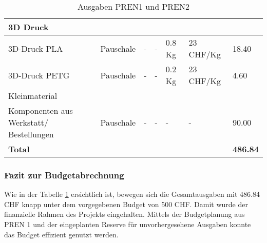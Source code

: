\documentclass[main.tex]{subfiles} %
\begin{document}
\begin{table}[htbp]
{\begin{tabular}{|p{3cm}|p{2.5cm}|p{2.5cm}|p{3cm}|p{1cm}|p{1.5cm}|p{1cm}|}
            \rowcolor{lightgray} 3D Druck           &                    &                              &                         &                 &                           &                            \\ \hline
            3D-Druck PLA                            & Pauschale          & -                            & -                       & 0.8 Kg          & 23 CHF/Kg                 & 18.40                          \\ \hline
            3D-Druck PETG                           & Pauschale          & -                            & -                       & 0.2 Kg          & 23 CHF/Kg                 & 4.60                         \\ \hline
            \rowcolor{lightgray} Kleinmaterial      &                    &                              &                         &                 &                           &                             \\ \hline
            Komponenten aus Werkstatt/ Bestellungen & Pauschale          & -                            & -                       & -               & -                         & 90.00                          \\ \hline
            \textbf{Total}                          &                    &                              &                         &                 &                           & \textbf{486.84}             \\ \hline
        \end{tabular}
    }
    \caption{Ausgaben PREN1 und PREN2}
    \label{tab:Ausgaben_PREN}
\end{table}

\subsubsection{Fazit zur Budgetabrechnung}
Wie in der Tabelle \ref{tab:Ausgaben_PREN} ersichtlich ist, bewegen sich die Gesamtausgaben mit 486.84 CHF knapp unter dem vorgegebenen Budget von 500 CHF. Damit wurde der
finanzielle Rahmen des Projekts eingehalten. Mittels der Budgetplanung aus PREN 1 und der eingeplanten Reserve für unvorhergesehene Ausgaben
konnte das Budget effizient genutzt werden.
\end{document}
